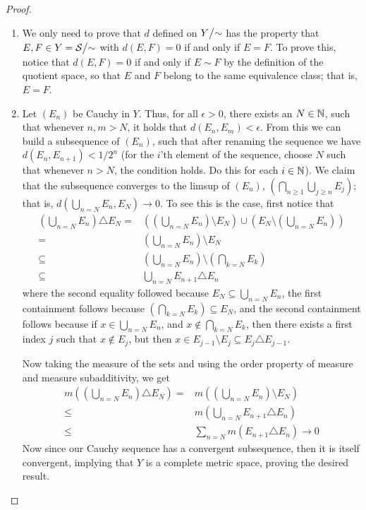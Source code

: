 \begin{proof}
\begin{enumerate}
    \item We only need to prove that $d$ defined on ${\textstyle Y}\big/{\textstyle \sim}$ has the property that $E, F \in Y = {\textstyle \mathcal{S}}\big/{\textstyle \sim}$ with $d(E, F) = 0$ if and only if $E = F$.
    To prove this, notice that $d(E, F) = 0$ if and only if $E \sim F$ by the definition of the quotient space, so that $E$ and $F$ belong to the same equivalence class;
    that is, $E = F$.
    
    \item Let $(E_n)$ be Cauchy in $Y$.
    Thus, for all $\epsilon >0$, there exists an $N \in \mathbb{N}$, such that whenever $n,m > N$, it holds that $d(E_n, E_m) < \epsilon$.
    From this we can build a subsequence of $(E_n)$, such that after renaming the sequence we have $d(E_n, E_{n+1}) < 1/2^n$ (for the $i$'th element of the sequence, choose $N$ such that whenever $n > N$, the condition holds.
    Do this for each $i \in \mathbb{N}$).
    We claim that the subsequence converges to the limsup of $(E_n)$, $(\bigcap_{n \geq 1} \bigcup_{j \geq n} E_j)$;
    that is, $d( \bigcup_{n = N} E_n, E_N) \to 0$.
    To see this is the case, first notice that 
    \begin{align*}
        (\bigcup_{n=N} E_n) \triangle E_N 
        =& ((\bigcup_{n=N} E_n )\setminus E_N) \cup (E_N \setminus (\bigcup_{n=N} E_n))\\
        =& (\bigcup_{n=N} E_n) \setminus E_N\\
        \subseteq& (\bigcup_{n=N} E_n) \setminus (\bigcap_{k=N} E_k)\\
        \subseteq& \bigcup_{n=N} E_{n+1} \triangle E_n
    \end{align*}
    where the second equality followed because $E_N \subseteq \bigcup_{n=N} E_n$, the first containment follows because $(\bigcap_{k=N} E_k) \subseteq E_N$, and the second containment follows because if $x \in \bigcup_{n=N} E_n$, and $x \notin \bigcap_{k=N} E_k$, then there exists a first index $j$ such that $x \notin E_j$, but then $x \in E_{j-1} \setminus E_j \subseteq E_j \triangle E_{j-1}$.

    Now taking the measure of the sets and using the order property of measure and measure subadditivity, we get
    \begin{align*}
        m((\bigcup_{n=N} E_n) \triangle E_N)
        =& m((\bigcup_{n=N} E_n) \setminus E_N)\\
        \leq& m(\bigcup_{n=N} E_{n+1} \triangle E_n)\\
        \leq& \sum_{n=N} m(E_{n+1} \triangle E_n) \to 0
    \end{align*}
    Now since our Cauchy sequence has a convergent subsequence, then it is itself convergent, implying that $Y$ is a complete metric space, proving the desired result.
    

\end{enumerate}
\end{proof}
